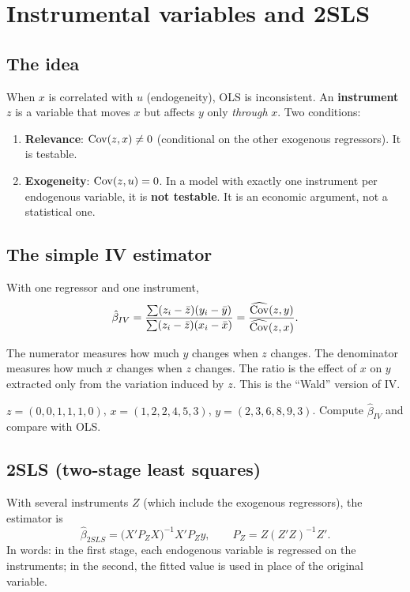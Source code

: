\chapter{Instrumental variables and 2SLS}
\label{cap:vi}

\section{The idea}
When $x$ is correlated with $u$ (endogeneity), OLS is inconsistent. An \textbf{instrument} $z$ is a variable that moves $x$ but affects $y$ only \emph{through} $x$. Two conditions:
\begin{enumerate}[leftmargin=1.6em]
\item \textbf{Relevance}: $\operatorname{Cov}(z,x)\ne0$ (conditional on the other exogenous regressors). It is testable.
\item \textbf{Exogeneity}: $\operatorname{Cov}(z,u)=0$. In a model with exactly one instrument per endogenous variable, it is \textbf{not testable}. It is an economic argument, not a statistical one.
\end{enumerate}

\section{The simple IV estimator}
With one regressor and one instrument,
\[
\hat\beta_{IV}=\frac{\sum(z_i-\bar z)(y_i-\bar y)}{\sum(z_i-\bar z)(x_i-\bar x)}=\frac{\widehat{\operatorname{Cov}}(z,y)}{\widehat{\operatorname{Cov}}(z,x)}.
\]
\begin{intuicao}
The numerator measures how much $y$ changes when $z$ changes. The denominator measures how much $x$ changes when $z$ changes. The ratio is the effect of $x$ on $y$ extracted only from the variation induced by $z$. This is the ``Wald'' version of IV.
\end{intuicao}

\begin{exercicio}
$z=(0,0,1,1,1,0)$, $x=(1,2,2,4,5,3)$, $y=(2,3,6,8,9,3)$. Compute $\hat\beta_{IV}$ and compare with OLS.
\end{exercicio}

\section{2SLS (two-stage least squares)}
With several instruments $Z$ (which include the exogenous regressors), the estimator is
\[
\hat\beta_{2SLS}=\big(X'P_ZX\big)^{-1}X'P_Zy,\qquad P_Z=Z(Z'Z)^{-1}Z'.
\]
In words: in the first stage, each endogenous variable is regressed on the instruments; in the second, the fitted value is used in place of the original variable.

